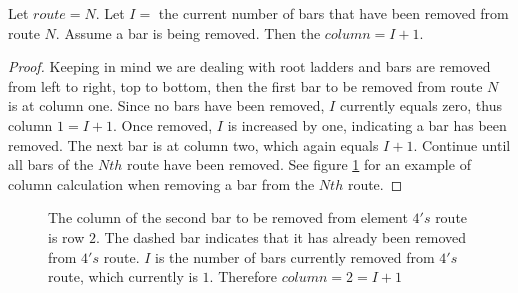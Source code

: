 \begin{lemma}
  Let $route=N$. Let $I=$ the current number of bars that have been removed from route $N$. Assume a bar is being removed.
  Then the $column=I+1$.
\end{lemma}
\begin{proof}
  Keeping in mind we are dealing with root ladders and bars are removed from left to right, top to bottom, then the first bar to 
  be removed from route $N$ is at column one. Since no bars have been removed, $I$ currently equals zero, 
  thus column $1=I+1$. Once removed, $I$ is increased by one, indicating a bar has been removed. The next bar is at column two, 
  which again equals $I+1$. Continue until all bars of the $Nth$ route have been removed. See figure \ref{fig:SJTcase4} for an example 
  of column calculation when removing a bar from the $Nth$ route.
\end{proof}

\begin{figure}[!htp]
  \begin{center}
  \end{center}
  \caption{The column of the second bar to be removed from element $4's$ route is row $2$. The dashed bar indicates that it has already been 
  removed from $4's$ route. $I$ is the number of bars currently removed from $4's$ route, which currently is $1$. Therefore $column=2=I+1$}

  \label{fig:SJTcase4}
\end{figure}



